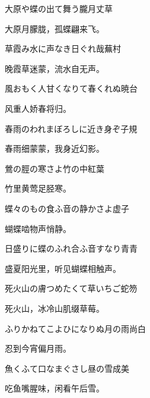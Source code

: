 \begin{haiku}
    {\FH 大原や蝶の出て舞う朧月}\hfill{\FH 丈草}

    {\FK 大原月朦胧，孤蝶翩来飞。}
\end{haiku}

\begin{haiku}
    {\FH 草霞み水に声なき日ぐれ哉}\hfill{\FH 蕪村}

    {\FK 晚霞草迷蒙，流水自无声。}
\end{haiku}

\begin{haiku}
    {\FH 風おもく人甘くなりて春くれぬ}\hfill{\FH 暁台}

    {\FK 风重人娇春将归。}
\end{haiku}

\begin{haiku}
    {\FH 春雨のわれまぼろしに近き身ぞ}\hfill{\FH 子規}

    {\FK 春雨细蒙蒙，我身近幻影。}
\end{haiku}

\begin{haiku}
    {\FH 鶯の脛の寒さよ竹の中}\hfill{\FH 紅葉}

    {\FK 竹里黄莺足胫寒。}
\end{haiku}

\begin{haiku}
    {\FH 蝶々のもの食ふ音の静かさよ}\hfill{\FH 虚子}

    {\FK 蝴蝶啮物声悄静。}
\end{haiku}

\begin{haiku}
    {\FH 日盛りに蝶のふれ合ふ音すなり}\hfill{\FH 青青}

    {\FK 盛夏阳光里，听见蝴蝶相触声。}
\end{haiku}

\begin{haiku}
    {\FH 死火山の膚つめたくて草いちご}\hfill{\FH 蛇笏}

    {\FK 死火山，冰冷山肌缀草莓。}
\end{haiku}

\begin{haiku}
    {\FH ふりかねてこよひになりぬ月の雨}\hfill{\FH 尚白}

    {\FK 忍到今宵偏月雨。}
\end{haiku}

\begin{haiku}
    {\FH 魚くふて口なまぐさし昼の雪}\hfill{\FH 成美}

    {\FK 吃鱼嘴腥味，闲看午后雪。}
\end{haiku}

